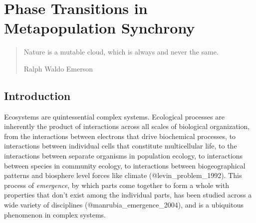 \hypertarget{phase-transitions-in-metapopulation-synchrony}{%
\section{Phase Transitions in Metapopulation
Synchrony}\label{phase-transitions-in-metapopulation-synchrony}}

\begin{quote}
\begin{flushright}Nature is a mutable cloud, which is always and never the same.

Ralph Waldo Emerson \end{flushright}
\end{quote}

\hypertarget{introduction}{%
\subsection{Introduction}\label{introduction}}

Ecosystems are quintessential complex systems. Ecological processes are
inherently the product of interactions across all scales of biological
organization, from the interactions between electrons that drive
biochemical processes, to interactions between individual cells that
constitute multicellular life, to the interactions between separate
organisms in population ecology, to interactions between species in
community ecology, to interactions between biogeographical patterns and
biosphere level forces like climate (@levin\_problem\_1992). This
process of \emph{emergence}, by which parts come together to form a
whole with properties that don't exist among the individual parts, has
been studied across a wide variety of disciplines
(@manrubia\_emergence\_2004), and is a ubiquitous phenomenon in complex
systems.


